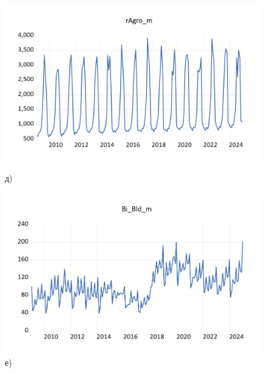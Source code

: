 \documentclass[a4paper, 14pt]{extreport}
\numberwithin{equation}{section}
\numberwithin{equation}{section}
\begin{document}
\begin{figure}[h!]
		\begin{minipage}{0.5\textwidth}
			\centering
			\includegraphics[scale=0.4]{images/image09}
			\caption*{д)}
		\end{minipage}%
		\hfill %
		\begin{minipage}{0.5\textwidth}
			\centering
			\includegraphics[scale=0.4]{images/image10}
			\caption*{е)}
		\end{minipage}
		

\end{figure}
\end{document}
